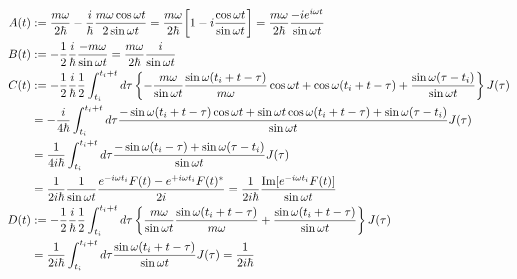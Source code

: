 \begin{subequations}
\begin{align}
    A(t)
    &:=
    \dfrac{m \omega}{2 \hbar}
    -
    \dfrac{i}{\hbar}
    \dfrac{m \omega \cos \omega t}{2 \sin \omega t}
=
    \dfrac{m \omega}{2 \hbar}
    \bigg[
        1
    -
        i
        \dfrac{\cos \omega t}{\sin \omega t}
    \bigg]
=
    \dfrac{m \omega}{2 \hbar}
    \dfrac{- i e^{i \omega t} }{\sin \omega t}
\\
    B(t)
    &:=
    -
    \dfrac{1}{2}
    \dfrac{i}{\hbar}
    \dfrac{- m \omega}{\sin \omega t}
    =
    \dfrac{m \omega}{2 \hbar}
    \dfrac{ i }{\sin \omega t}
\\
    C(t)
    &:=
    -
    \frac{1}{2}
    \dfrac{i}{\hbar}
    \dfrac{1}{2}
    \int_{t_i}^{t_i + t} d\tau
    \left\{
    -
        \dfrac{m \omega}{\sin \omega t}
            \dfrac{
                \sin \omega (t_i + t - \tau)
            }{m \omega}
        \cos \omega t
    +
        \cos \omega (t_i + t - \tau)
    +
        \dfrac{\sin \omega (\tau - t_i)}{\sin \omega t}
    \right\}
    J(\tau)
\notag\\&=
    -
    \dfrac{i}{4 \hbar}
    \int_{t_i}^{t_i + t} d\tau
    \dfrac{
    -
        \sin \omega (t_i + t - \tau)
        \cos \omega t
    +
        \sin \omega t
        \cos \omega (t_i + t - \tau)
    +
        \sin \omega (\tau - t_i)
    }{\sin \omega t}
    J(\tau)
\notag\\&=
    \dfrac{1}{4 i \hbar}
    \int_{t_i}^{t_i + t} d\tau
    \dfrac{
    -
        \sin \omega (t_i - \tau)
    +
        \sin \omega (\tau - t_i)
    }{\sin \omega t}
    J(\tau)
\notag\\&=
    \dfrac{1}{2 i \hbar}
    \dfrac{
        1
    }{\sin \omega t}
    \dfrac{
        e^{- i \omega t_i} F(t)
        -
        e^{+ i \omega t_i} F(t)^*
    }{ 2i }
=
    \dfrac{1}{2 i \hbar}
    \dfrac{
        \Im[ e^{- i \omega t_i} F(t) ]
    }{\sin \omega t}
\\
    D(t)
    &:=
    -
    \dfrac{1}{2}
    \dfrac{i}{\hbar}
    \dfrac{1}{2}
    \int_{t_i}^{t_i + t} d \tau
    \left\{
        \dfrac{m \omega}{\sin \omega t}
        \dfrac{
            \sin \omega (t_i + t - \tau)
        }{m \omega}
    +
        \dfrac{
            \sin \omega (t_i + t - \tau)
        }{\sin \omega t}
    \right\}
    J(\tau)
\notag\\&=
    \dfrac{1}{2 i \hbar}
    \int_{t_i}^{t_i + t} d \tau
        \dfrac{
            \sin \omega (t_i + t - \tau)
        }{\sin \omega t}
    J(\tau)
=
    \dfrac{1}{2 i \hbar}

\end{align}
\end{subequations}
